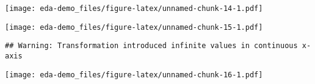 \documentclass[]{article}
\newenvironment{Shaded}{\begin{snugshade}}{\end{snugshade}}
\newcommand{\KeywordTok}[1]{\textcolor[rgb]{0.13,0.29,0.53}{\textbf{#1}}}
\newcommand{\DataTypeTok}[1]{\textcolor[rgb]{0.13,0.29,0.53}{#1}}
\newcommand{\DecValTok}[1]{\textcolor[rgb]{0.00,0.00,0.81}{#1}}
\newcommand{\StringTok}[1]{\textcolor[rgb]{0.31,0.60,0.02}{#1}}
\newcommand{\OperatorTok}[1]{\textcolor[rgb]{0.81,0.36,0.00}{\textbf{#1}}}
\newcommand{\NormalTok}[1]{#1}
\begin{document}
\texttt{[image: eda-demo\_files/figure-latex/unnamed-chunk-14-1.pdf]}

\begin{Shaded}
\end{Shaded}

\texttt{[image: eda-demo\_files/figure-latex/unnamed-chunk-15-1.pdf]}

\begin{Shaded}
\end{Shaded}

\begin{verbatim}
## Warning: Transformation introduced infinite values in continuous x-axis
\end{verbatim}

\texttt{[image: eda-demo\_files/figure-latex/unnamed-chunk-16-1.pdf]}
\end{document}
